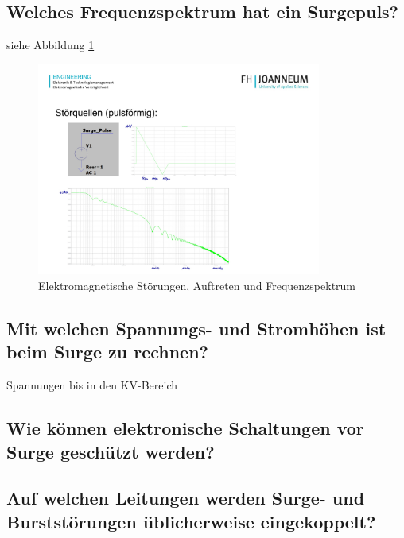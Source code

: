 \subsection{Welches Frequenzspektrum hat ein Surgepuls?}
siehe Abbildung \ref{fig:lv4:surge_puls}
\begin{figure}[ht]
  \centering
  \includegraphics[height=7cm]{src/assets/pictures/lv4_surge_pulse.jpg}
  \caption{Elektromagnetische Störungen, Auftreten und Frequenzspektrum}\label{fig:lv4:surge_puls}
\end{figure}

\subsection{Mit welchen Spannungs- und Stromhöhen ist beim Surge zu rechnen?}
Spannungen bis in den KV-Bereich

\subsection{Wie können elektronische Schaltungen vor Surge geschützt werden?}


\subsection{Auf welchen Leitungen werden Surge- und Burststörungen üblicherweise eingekoppelt?}

\pagebreak
